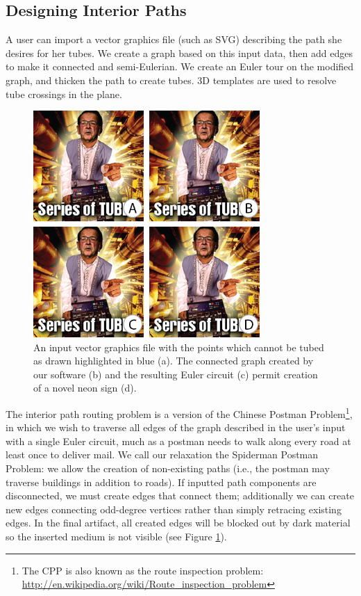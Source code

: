 \subsection{Designing Interior Paths}

A user can import a vector graphics file (such as SVG) describing the path she desires for her tubes.  We create a graph based on this input data, then add edges to make it connected and semi-Eulerian.  We create an Euler tour on the modified graph, and thicken the path to create tubes.  3D templates are used to resolve tube crossings in the plane.

\begin{figure}[h!]
\centering
    \includegraphics[width=3.4in]{figures/interior.png}
\caption{An input vector graphics file with the points which cannot be tubed as drawn highlighted in {\color{blue}blue} (a).  The connected graph created by our software (b) and the resulting Euler circuit (c) permit creation of a novel neon sign (d).}
\label{fig:tool-process-interior}
\end{figure}

The interior path routing problem is a version of the Chinese Postman Problem\footnote{The CPP is also known as the route inspection problem: \url{http://en.wikipedia.org/wiki/Route_inspection_problem}}, in which we wish to traverse all edges of the graph described in the user's input with a single Euler circuit, much as a postman needs to walk along every road at least once to deliver mail.  We call our relaxation the Spiderman Postman Problem: we allow the creation of non-existing paths (i.e., the postman may traverse buildings in addition to roads).  If inputted path components are disconnected, we must create edges that connect them; additionally we can create new edges connecting odd-degree vertices rather than simply retracing existing edges.  In the final artifact, all created edges will be blocked out by dark material so the inserted medium is not visible (see Figure \ref{fig:tool-process-interior}).

